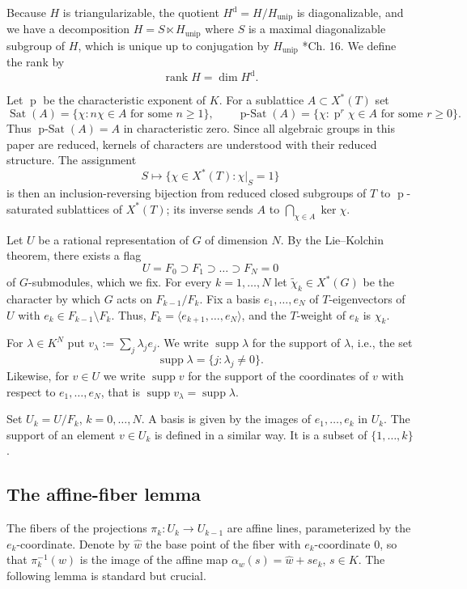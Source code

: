 \documentclass[12pt]{article}
\newcommand{\rk}{\operatorname{rank}}
\newcommand{\supp}{\operatorname{supp}}
\newcommand{\rest}{\big |}
\newcommand{\rad}[1]{#1_{\operatorname{unip}}}
\newcommand{\Sat}{\operatorname{Sat}}
\newcommand{\pSat}{\operatorname{p-Sat}}
\newcommand{\diag}{\mathrm{d}}
\newcommand{\charexp}{\operatorname{p}}
\begin{document}
Because $H$ is triangularizable, the quotient $H^{\diag}=H/\rad{H}$ is diagonalizable, and 
we have a decomposition $H=S\ltimes \rad{H}$ where $S$ is a maximal diagonalizable subgroup of $H$, which is unique up to conjugation by $\rad{H}$
\cite{MR3729270}*{Ch. 16}.
We define the rank by
\[
\rk H=\dim H^{\diag}.
\]


Let $\charexp$ be the characteristic exponent of $K$.  For a sublattice $A\subset X^*(T)$ set
\[
 \Sat(A)=\{\chi:n\chi\in A\text{ for some }n\ge1\},\qquad
 \pSat(A)=\{\chi:\charexp^r\chi\in A\text{ for some }r\ge0\}.
\]
Thus $\pSat(A)=A$ in characteristic zero.  Since all algebraic groups in
this paper are reduced, kernels of characters are understood with their reduced
structure.  The assignment
\begin{equation} \label{eq: psatrec}
 S\longmapsto\{\chi\in X^*(T):\chi\rest_S=1\}
\end{equation}
is then an inclusion-reversing bijection from reduced closed subgroups of $T$ to
$\charexp$-saturated sublattices of $X^*(T)$; its inverse sends $A$ to
$\bigcap_{\chi\in A}\ker\chi$.

Let $U$ be a rational representation of $G$ of dimension $N$.
By the Lie--Kolchin theorem, there exists a flag
\[
U=F_0\supset F_1\supset\dots\supset F_N=0
\]
of $G$-submodules, which we fix.
For every $k=1,\dots,N$ let $\tilde\chi_k\in X^*(G)$ be the character by which $G$ acts on $F_{k-1}/F_k$.
Fix a basis $e_1,\dots,e_N$ of $T$-eigenvectors of $U$ with $e_k\in F_{k-1}\setminus F_k$.
Thus, $F_k=\langle e_{k+1},\dots,e_N\rangle$, and the $T$-weight of $e_k$ is $\chi_k$.

For $\lambda\in K^N$ put $v_\lambda:=\sum_j\lambda_je_j$.
We write $\supp\lambda$ for the support of $\lambda$, i.e., the set
\[
\supp\lambda=\{j:\lambda_j\ne0\}.
\]
Likewise, for $v\in U$ we write $\supp v$ for the support of the coordinates of $v$ with respect to $e_1,\dots,e_N$,
that is $\supp v_\lambda=\supp\lambda$.

Set $U_k=U/F_k$, $k=0,\dots,N$. A basis is given by the images of $e_1,\dots,e_k$ in $U_k$. The support of an element $v\in U_k$ is defined
in a similar way. It is a subset of $\{1,\dots,k\}$.


\subsection{The affine-fiber lemma}
The fibers of the projections $\pi_k\colon U_k\to U_{k-1}$ are affine lines, parameterized by the $e_k$-coordinate.
Denote by $\hat w$ the base point of the fiber with $e_k$-coordinate $0$, so that
$\pi_k^{-1}(w)$ is the image of the affine map $\alpha_w(s)=\hat w+se_k$, $s\in K$.
The following lemma is standard but crucial.
\end{document}
